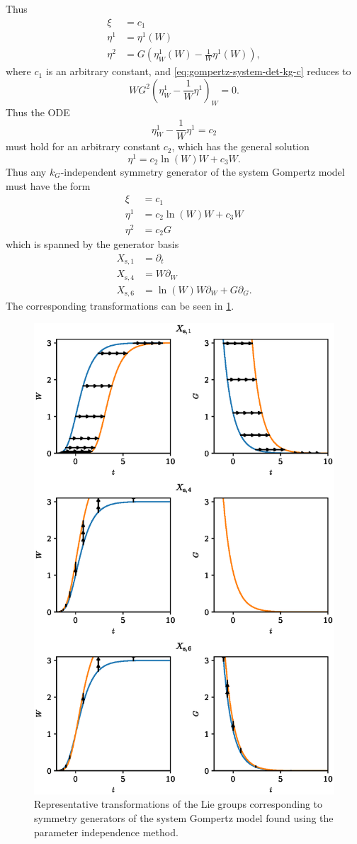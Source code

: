 Thus
\begin{align*}
  \xi &= c_1 \\
  \eta^1 &= \eta^1(W) \\
  \eta^2 &= G \left(\eta^1_W(W) - \frac{1}{W} \eta^1(W) \right),
\end{align*}
where \(c_1\) is an arbitrary constant, and \cref{eq:gompertz-system-det-kg-c} reduces to
\begin{equation*}
  W G^2 \left(\eta^1_W - \frac{1}{W} \eta^1 \right)_W = 0.
\end{equation*}
Thus the ODE
\begin{equation*}
  \eta^1_W - \frac{1}{W} \eta^1 = c_2
\end{equation*}
must hold for an arbitrary constant \(c_2\), which has the general solution
\begin{equation*}
  \eta^1 = c_2 \ln\left(W\right) W + c_3 W.
\end{equation*}
Thus any \(k_G\)-independent symmetry generator of the system Gompertz model  must have the form
\begin{align*}
  \xi &= c_1 \\
  \eta^1 &= c_2 \ln\left(W\right) W + c_3 W\\
  \eta^2 &= c_2 G
\end{align*}
which is spanned by the generator basis
\begin{align*}
  X_{\text{s},1} &= \partial_t \\
  X_{\text{s},4} &= W \partial_W \\
  X_{\text{s},6} &= \ln\left(W\right) W \partial_W + G \partial_G.
\end{align*}
The corresponding transformations can be seen in \cref{fig:gompertz-system-param}.
\begin{figure}
  \centering
  \includegraphics[width=.4772\textwidth]{images/gompertz-system-param}
  \caption{Representative transformations of the Lie groups corresponding to symmetry generators of the system Gompertz model found using the parameter independence method.}
  \label{fig:gompertz-system-param}
\end{figure}


